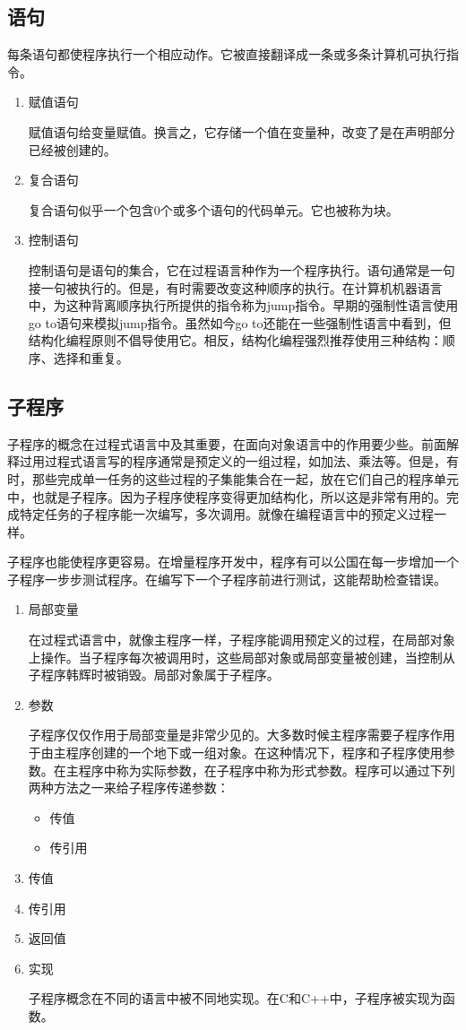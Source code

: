 \subsection{语句}
每条语句都使程序执行一个相应动作。它被直接翻译成一条或多条计算机可执行指令。
\begin{enumerate}
	\item 赋值语句

	赋值语句给变量赋值。换言之，它存储一个值在变量种，改变了是在声明部分已经被创建的。
	\item 复合语句
	
	复合语句似乎一个包含0个或多个语句的代码单元。它也被称为块。
	\item 控制语句

	控制语句是语句的集合，它在过程语言种作为一个程序执行。语句通常是一句接一句被执行的。但是，有时需要改变这种顺序的执行。在计算机机器语言中，为这种背离顺序执行所提供的指令称为jump指令。早期的强制性语言使用go to语句来模拟jump指令。虽然如今go to还能在一些强制性语言中看到，但结构化编程原则不倡导使用它。相反，结构化编程强烈推荐使用三种结构：顺序、选择和重复。
\end{enumerate}
\subsection{子程序}
子程序的概念在过程式语言中及其重要，在面向对象语言中的作用要少些。前面解释过用过程式语言写的程序通常是预定义的一组过程，如加法、乘法等。但是，有时，那些完成单一任务的这些过程的子集能集合在一起，放在它们自己的程序单元中，也就是子程序。因为子程序使程序变得更加结构化，所以这是非常有用的。完成特定任务的子程序能一次编写，多次调用。就像在编程语言中的预定义过程一样。

子程序也能使程序更容易。在增量程序开发中，程序有可以公国在每一步增加一个子程序一步步测试程序。在编写下一个子程序前进行测试，这能帮助检查错误。
\begin{enumerate}
	\item 局部变量

	在过程式语言中，就像主程序一样，子程序能调用预定义的过程，在局部对象上操作。当子程序每次被调用时，这些局部对象或局部变量被创建，当控制从子程序韩辉时被销毁。局部对象属于子程序。
	\item 参数

子程序仅仅作用于局部变量是非常少见的。大多数时候主程序需要子程序作用于由主程序创建的一个地下或一组对象。在这种情况下，程序和子程序使用参数。在主程序中称为实际参数，在子程序中称为形式参数。程序可以通过下列两种方法之一来给子程序传递参数：
	\begin{itemize}
		\item 传值
		\item 传引用
	\end{itemize}
	\item 传值
	\item 传引用
	\item 返回值
	\item 实现

	子程序概念在不同的语言中被不同地实现。在C和C++中，子程序被实现为函数。
\end{enumerate}
